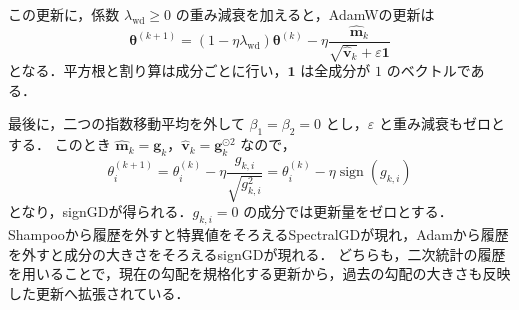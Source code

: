 \documentclass[../main.tex]{subfiles}
\begin{document}
この更新に，係数 $\lambda_{\mathrm{wd}}\geq0$ の重み減衰を加えると，AdamWの更新は
\begin{equation}
  \bm{\theta}^{(k+1)}
  =(1-\eta\lambda_{\mathrm{wd}})\bm{\theta}^{(k)}
  -\eta\frac{\widehat{\bm{m}}_k}
    {\sqrt{\widehat{\bm{v}}_k}+\varepsilon\bm{1}}
  \label{eq:md-adamw-update}
\end{equation}
となる\cite{loshchilov2019adamw}．平方根と割り算は成分ごとに行い，$\bm{1}$ は全成分が $1$ のベクトルである．

最後に，二つの指数移動平均を外して $\beta_1=\beta_2=0$ とし，$\varepsilon$ と重み減衰もゼロとする．
このとき $\widehat{\bm{m}}_k=\bm{g}_k$，$\widehat{\bm{v}}_k=\bm{g}_k^{\odot2}$ なので，
\begin{equation}
  \theta_i^{(k+1)}
  =\theta_i^{(k)}-\eta\frac{g_{k,i}}{\sqrt{g_{k,i}^2}}
  =\theta_i^{(k)}-\eta\operatorname{sign}(g_{k,i})
  \label{eq:md-adam-signgd}
\end{equation}
となり，signGDが得られる\cite{eschenhagen2026clarifying}．$g_{k,i}=0$ の成分では更新量をゼロとする．
Shampooから履歴を外すと特異値をそろえるSpectralGDが現れ，Adamから履歴を外すと成分の大きさをそろえるsignGDが現れる．
どちらも，二次統計の履歴を用いることで，現在の勾配を規格化する更新から，過去の勾配の大きさも反映した更新へ拡張されている．

\chapterbibliography
\end{document}
